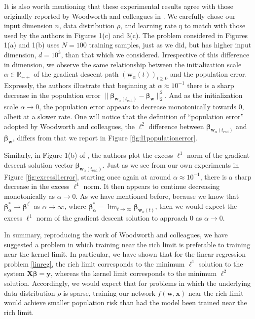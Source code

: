 \documentclass{article}
\begin{document}
It is also worth mentioning that these experimental results agree with those originally reported by Woodworth and colleagues in \cite{woodworth2020kernel}. We carefully chose our input dimension $n$, data distribution $\rho$, and learning rate $\eta$ to match with those used by the authors in Figures 1(c) and 3(c). The problem considered in Figures 1(a) and 1(b) uses $N=100$ training samples, just as we did, but has higher input dimension, $d=10^3$, than that which we considered. Irrespective of this difference in dimension, we observe the same relationship between the initialization scale $\alpha \in \mathbb{R}_{++}$ of the gradient descent path $(\boldsymbol{w}_{\alpha}(t))_{t \geq 0}$ and the population error. Expressly, the authors illustrate that beginning at $\alpha \approx 10^{-1}$ there is a sharp decrease in the population error $\| \boldsymbol{\beta}_{\boldsymbol{w}_{\alpha}(t_{\text{end}})} - \boldsymbol{\beta}_{\boldsymbol{w}} \|_2^2$. And as the initialization scale $\alpha \rightarrow 0$, the population error appears to decrease monotonically towards $0$, albeit at a slower rate. One will notice that the definition of \enquote{population error} adopted by Woodworth and colleagues, the $\ell^2$ difference between $\boldsymbol{\beta}_{\boldsymbol{w}_{\alpha}(t_{\text{end}})}$ and $\boldsymbol{\beta}_{\boldsymbol{w}}$, differs from that we report in Figure \ref{fig:l1populationerror}. 

Similarly, in Figure 1(b) of \cite{woodworth2020kernel}, the authors plot the excess $\ell^1$ norm of the gradient descent solution vector $\boldsymbol{\beta}_{\boldsymbol{w}_{\alpha}(t_{\text{end}})}$. Just as we see from our own experiments in Figure \ref{fig:excessl1error}, starting once again at around $\alpha \approx 10^{-1}$, there is a sharp decrease in the excess $\ell^1$ norm. It then appears to continue decreasing monotonically as $\alpha \rightarrow 0$. As we have mentioned before, because we know that $\boldsymbol{\beta}_{\alpha}^* \rightarrow \boldsymbol{\beta}^{\ell^1}$ as $\alpha \rightarrow \infty$, where $\boldsymbol{\beta}_{\alpha}^* = \lim_{t \to \infty} \boldsymbol{\beta}_{\boldsymbol{w}_{\alpha}(t)}$, then we would expect the excess $\ell^1$ norm of the gradient descent solution to approach $0$ as $\alpha \rightarrow 0$.

In summary, reproducing the work of Woodworth and colleagues, we have suggested a problem in which training near the rich limit is preferable to training near the kernel limit. In particular, we have shown that for the linear regression problem \ref{linreg}, the rich limit corresponds to the minimum $\ell^1$ solution to the system $\boldsymbol{X}\boldsymbol{\beta} = \boldsymbol{y}$, whereas the kernel limit corresponds to the minimum $\ell^2$ solution. Accordingly, we would expect that for problems in which the underlying data distribution $\rho$ is sparse, training our network $f(\boldsymbol{w}, \boldsymbol{x})$ near the rich limit would achieve smaller population risk than had the model been trained near the rich limit.
\end{document}
